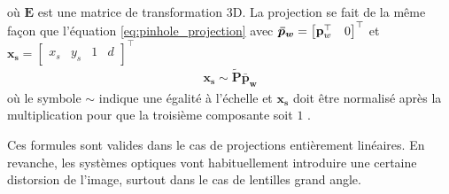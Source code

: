 où $\boldsymbol{E}$ est une matrice de transformation 3D. La projection se fait de la même façon que l'équation \ref{eq:pinhole_projection} avec $\boldsymbol{\bar{p}_w} = \begin{bmatrix}\mathbf{p}_w^\top & 0 \end{bmatrix}^\top$ et $\boldsymbol{x_s} = \begin{bmatrix}x_s & y_s & 1 & d\end{bmatrix}^\top$
\begin{align}
  \boldsymbol{x_s} \sim \boldsymbol{\tilde{P}} \boldsymbol{\bar{p}_w}
\end{align}
où le symbole $\sim$ indique une égalité à l'échelle et $\boldsymbol{x_s}$ doit être normalisé après la multiplication pour que la troisième composante soit $1$ \citep{Szeliski2011}.

Ces formules sont valides dans le cas de projections entièrement linéaires. En revanche, les systèmes optiques vont habituellement introduire une certaine distorsion de l'image, surtout dans le cas de lentilles grand angle.


